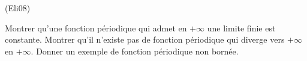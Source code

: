 \begin{tiny}(Eli08)\end{tiny} Montrer qu'une fonction périodique qui admet en $+\infty$ une limite finie est constante.\newline
Montrer qu'il n'existe pas de fonction périodique qui diverge vers $+\infty$ en $+\infty$.\newline
Donner un exemple de fonction périodique non bornée.
